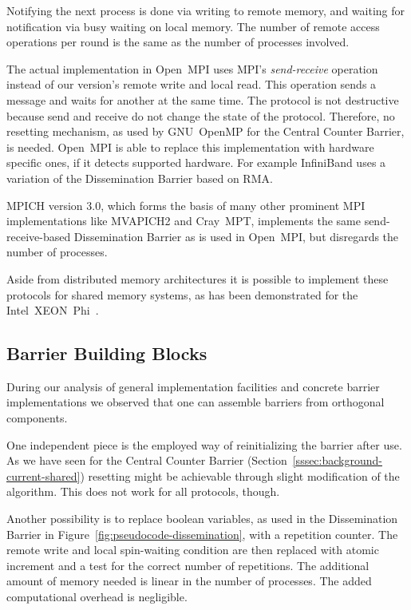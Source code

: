 \documentclass[a4paper, 10pt]{article}
\begin{document}
Notifying the next process is done via writing to remote memory, and waiting for notification via busy waiting on local memory. The number of remote access operations per round is the same as the number of processes involved.

The actual implementation in Open~MPI uses MPI's \emph{send-receive} operation instead of our version's remote write and local read. This operation sends a message and waits for another at the same time. The protocol is not destructive because send and receive do not change the state of the protocol. Therefore, no resetting mechanism, as used by GNU~OpenMP for the Central Counter Barrier, is needed.
Open~MPI is able to replace this implementation with hardware specific ones, if it detects supported hardware. For example InfiniBand uses a variation of the Dissemination Barrier based on RMA\cite{hoefler2006a}.

MPICH version 3.0, which forms the basis of many other prominent MPI implementations like MVAPICH2 and Cray~MPT, implements the same send-receive-based Dissemination Barrier as is used in Open~MPI, but disregards the number of processes.

Aside from distributed memory architectures it is possible to implement these protocols for shared memory systems, as has been demonstrated for the Intel~XEON~Phi~\cite{hoefler2013}.

\subsection{Barrier Building Blocks}
\label{ssec:background-building-blocks}
During our analysis of general implementation facilities and concrete barrier implementations we observed that one can assemble barriers from orthogonal components.

One independent piece is the employed way of reinitializing the barrier after use. As we have seen for the Central Counter Barrier (Section~\ref{sssec:background-current-shared}) resetting might be achievable through slight modification of the algorithm. This does not work for all protocols, though.

Another possibility is to replace boolean variables, as used in the Dissemination Barrier in Figure~\ref{fig:pseudocode-dissemination}, with a repetition counter. The remote write and local spin-waiting condition are then replaced with atomic increment and a test for the correct number of repetitions. The additional amount of memory needed is linear in the number of processes. The added computational overhead is negligible.
\end{document}
